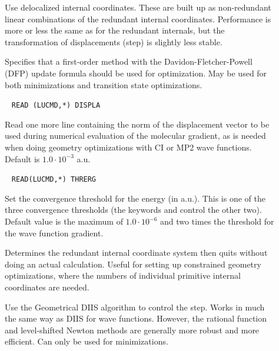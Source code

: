 \begin{description}
\item[]
Use delocalized internal coordinates.
These are built up as
non-redundant linear combinations of the redundant internal
coordinates. Performance is more or less the same as for the redundant
internals, but the transformation of displacements (step) is slightly
less stable.

\item[]
Specifies that a first-order method with the
Davidon-Fletcher-Powell (DFP) update
formula should be used for optimization. May be used for both
minimizations and transition state optimizations.

\item[]\verb| |\newline
\verb|READ (LUCMD,*) DISPLA|

Read one more line containing the norm of the displacement vector to
be used during numerical evaluation of the molecular gradient, as is
needed when doing geometry optimizations with CI or MP2 wave
functions. Default is $1.0\cdot 10^{-3}$ a.u.

\item[]\verb| |
\newline
\verb|READ(LUCMD,*) THRERG|

Set the convergence threshold for the energy (in a.u.). This is one of the three
convergence thresholds (the keywords
 and 
control the other two). Default value is the maximum of $1.0\cdot
10^{-6}$ and two times the threshold for the wave function gradient.

\item[]
Determines the redundant internal coordinate system then quits without
doing an actual calculation. Useful for setting up constrained
geometry optimizations, where the numbers of individual primitive
internal coordinates are needed.

\item[]
Use the Geometrical DIIS\cite{pcppjms114}
algorithm to control the
step. Works in much the same way as DIIS for wave functions. However,
the rational function and level-shifted Newton methods are generally
more robust and more efficient. Can only be used for minimizations.


\end{description}
